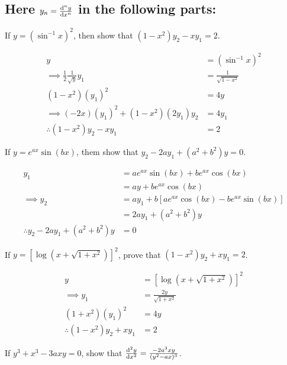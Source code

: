 \subsection{Here $y_n=\dv[n]{y}{x}$ in the following parts:}
\begin{asign}
	If $y=(\sin^{-1}x)^2$, then show that $(1-x^2)y_2-xy_1=2$.
\end{asign}
\begin{anse}
	\[\begin{split}
		y&=(\sin^{-1}x)^2\\
		\implies \frac{1}{2}\frac{1}{\sqrt{y}}y_1&=\frac{1}{\sqrt{1-x^2}}\\
		(1-x^2)(y_1)^2&=4y\\
		\implies (-2x)(y_1)^2+(1-x^2)(2y_1)y_2&=4y_1\\
		\therefore (1-x^2)y_2-xy_1&=2
	\end{split}\]
\end{anse}
\begin{asign}
	If $y=e^{ax}\sin(bx)$, them show that $y_2-2ay_1+(a^2+b^2)y=0$.
\end{asign}
\begin{anse}
	\[\begin{split}
		y_1&=ae^{ax}\sin(bx)+be^{ax}\cos(bx)\\
		&=ay+be^{ax}\cos(bx)\\
		\implies y_2&=ay_1+b[ae^{ax}\cos(bx)-be^{ax}\sin(bx)] \\
		&=2ay_1+(a^2+b^2)y\\
		\therefore y_2-2ay_1+(a^2+b^2)y&=0
	\end{split}\]
\end{anse}
\begin{asign}
	If $y=[\log(x+\sqrt{1+x^2})]^2$, prove that $(1-x^2)y_2+xy_1=2$.
\end{asign}
\begin{anse}
	\[\begin{split}
		y&=[\log(x+\sqrt{1+x^2})]^2\\
		\implies y_1&=\frac{2y}{\sqrt{1+x^2}}\\
		(1+x^2)(y_1)^2&=4y\\
		\therefore (1-x^2)y_2+xy_1&=2
	\end{split}\]
\end{anse}
\begin{asign}
	If $y^3+x^3-3axy=0$, show that $\dv[2]{y}{x}=\frac{-2a^3xy}{(y^2-ax)^3}$.
\end{asign}
\begin{anse}
	
\end{anse}
